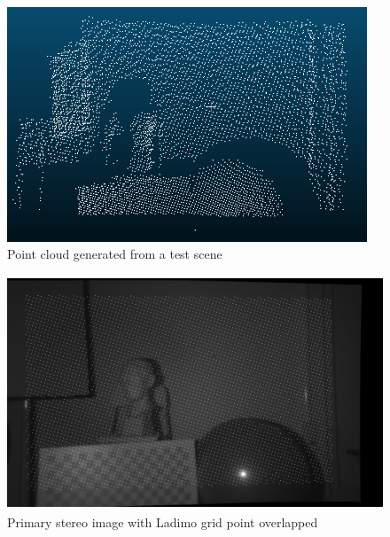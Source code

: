 \begin{figure}[t]
	\begin{center}
		\includegraphics[width=.8\textwidth, height=7cm, keepaspectratio]{images/point-cloud-example.png}
		\caption{Point cloud generated from a test scene}
		\label{fig:point-cloud-input}
	\end{center}
\end{figure}

\begin{figure}[t]
	\begin{center}
		\includegraphics[width=.8\textwidth, height=7cm, keepaspectratio]{images/stereo-rectified-rgb.png}
		\caption{Primary stereo image with Ladimo grid point overlapped}
		\label{fig:primary-stereo-input}
	\end{center}
\end{figure}

